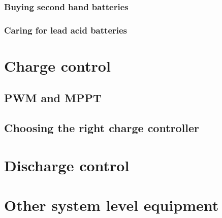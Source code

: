 \documentclass{article}
\theoremstyle{definition}
\theoremstyle{definition}
\theoremstyle{remark}
\begin{document}

    \subsubsection{Buying second hand batteries} %
    \label{ssub:buying_second_hand_batteries}
    

    \subsubsection{Caring for lead acid batteries} %
    \label{ssub:caring_for_lead_acid_batteries}
    




\section{Charge control} %
\label{sec:charge_control}

  \subsection{PWM and MPPT} %
  \label{sub:pwm_and_mppt}
  

  \subsection{Choosing the right charge controller} %
  \label{sub:choosing_the_right_charge_controller}
  


\section{Discharge control} %
\label{sec:discharge_control}


\section{Other system level equipment} %
\label{sec:other_system_level_equipment}
\end{document}
